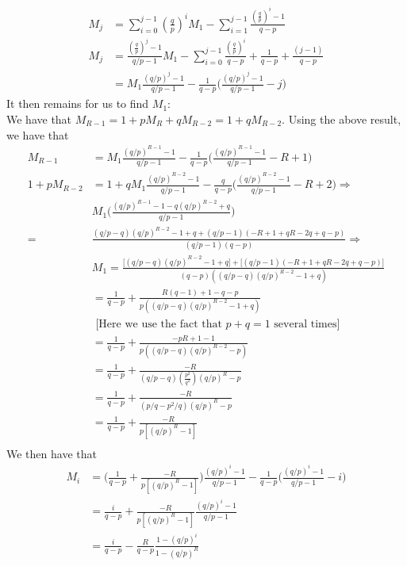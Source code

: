 \documentclass[12pt,twoside, letter]{exam}
\theoremstyle{definition}
\begin{document}
\begin{enumerate}
\begin{solution}
\begin{align*}
        M_{j} &= \sum^{j-1}_{i=0} (\frac{q}{p})^i M_1 - \sum^{j-1}_{i=1} \frac{(\frac{q}{p})^i - 1}{q-p} \\
        M_{j} &= \frac{(\frac{q}{p})^j - 1}{q/p -1} M_1 - \sum^{j-1}_{i=0} \frac{(\frac{q}{p})^i}{q-p} + \frac{1}{q-p} + \frac{(j-1)}{q-p}\\
        &= M_{1}\frac{(q/p)^j - 1}{q/p -1} - \frac{1}{q-p}\bigg(\frac{(q/p)^{j}-1}{q/p-1} - j\bigg)
      \end{align*}
      It then remains for us to find $M_1$: \\
      We have that $M_{R-1} = 1 + pM_{R} + qM_{R-2} = 1 + qM_{R-2}$. Using the above result, we have that
      \begin{align*}
        M_{R-1} &= M_{1}\frac{(q/p)^{R-1} - 1}{q/p -1} - \frac{1}{q-p}\bigg(\frac{(q/p)^{R-1}-1}{q/p-1} - R + 1\bigg) \\
        1 + pM_{R-2} &= 1 + qM_{1}\frac{(q/p)^{R-2} - 1}{q/p -1} - \frac{q}{q-p}\bigg(\frac{(q/p)^{R-2}-1}{q/p-1} - R + 2\bigg)  \Rightarrow \\
        &M_1 \bigg(\frac{(q/p)^{R-1} - 1 - q(q/p)^{R-2} + q}{q/p - 1} \bigg) \\
        = &\frac{(q/p - q)(q/p)^{R-2}- 1 + q + (q/p-1)(-R + 1 + qR - 2q + q-p)}{(q/p - 1)(q-p)} \Rightarrow \\
        &M_1 = \frac{\big[(q/p - q)(q/p)^{R-2}-1+q\big] + \big[(q/p-1)(- R + 1 + qR - 2q + q-p)\big]}{(q-p)((q/p - q)(q/p)^{R-2}-1+q)} \\
        &= \frac{1}{q-p} + \frac{R(q - 1) + 1 - q - p}{p((q/p - q)(q/p)^{R-2}-1+q)} \\
        &\text{ [Here we use the fact that $p+q = 1$ several times]} \\
        &= \frac{1}{q-p} + \frac{-pR + 1 - 1}{p((q/p - q)(q/p)^{R-2}-p)} \\
        &= \frac{1}{q-p} + \frac{-R}{(q/p - q)(\frac{p^2}{q^2})(q/p)^{R}-p} \\
        &=  \frac{1}{q-p} + \frac{-R}{(p/q - p^2/q)(q/p)^{R}-p} \\
        &=  \frac{1}{q-p} + \frac{-R}{p[(q/p)^{R}-1]} \\
      \end{align*}
      We then have that
        \begin{align*}
          M_{i} &= \bigg(\frac{1}{q-p} + \frac{-R}{p[(q/p)^{R}-1]} \bigg)\frac{(q/p)^i - 1}{q/p -1} - \frac{1}{q-p}\bigg(\frac{(q/p)^{i}-1}{q/p-1} - i\bigg) \\
          &= \frac{i}{q-p} + \frac{-R}{p[(q/p)^{R}-1]}\frac{(q/p)^i - 1}{q/p -1} \\
          &= \frac{i}{q-p} - \frac{R}{q-p}\frac{1-(q/p)^i}{1-(q/p)^R}
        \end{align*}
      \end{solution}
\end{enumerate}
\end{document}
